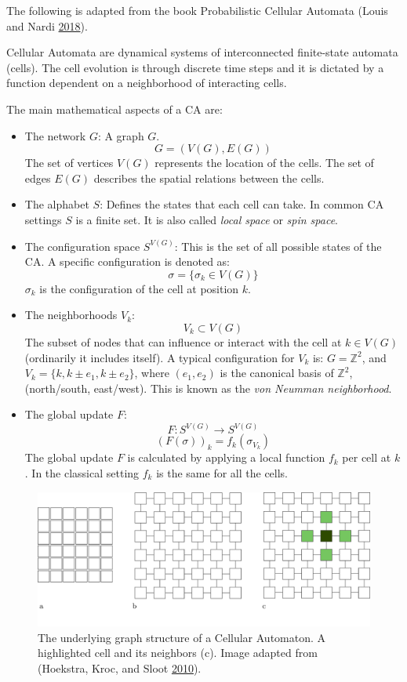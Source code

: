 \documentclass[
  12pt,
  openany]{book}
\begin{document}
The following is adapted from the book Probabilistic Cellular Automata (Louis and Nardi \protect\hyperlink{ref-louis2018probabilistic}{2018}).

Cellular Automata are dynamical systems of interconnected finite-state automata (cells). The cell evolution is through discrete time steps and it is dictated by a function dependent on a neighborhood of interacting cells.

The main mathematical aspects of a CA are:

\begin{itemize}
\item
  The network \(G\):
  A graph \(G\).
  \[ G = (V(G), E(G)) \]
  The set of vertices \(V(G)\) represents the location of the cells. The set of edges \(E(G)\) describes the spatial relations between the cells.
\item
  The alphabet \(S\):
  Defines the states that each cell can take. In common CA settings \(S\) is a finite set. It is also called \emph{local space} or \emph{spin space}.
\item
  The configuration space \(S^{V(G)}\):
  This is the set of all possible states of the CA. A specific configuration is denoted as:
  \[ \sigma = \{\sigma_k \in V(G)\} \]
  \(\sigma_k\) is the configuration of the cell at position \(k\).
\item
  The neighborhoods \(V_k\):
  \[ V_k \subset  V(G) \]
  The subset of nodes that can influence or interact with the cell at \(k \in V(G)\) (ordinarily it includes itself). A typical configuration for \(V_k\) is: \(G = \mathds{Z}^2\), and \(V_k = \{k, k \pm e_1, k \pm e_2\}\), where \((e_1, e_2)\) is the canonical basis of \(\mathds{Z}^2\), (north/south, east/west). This is known as the \emph{von Neumman neighborhood}.
\item
  The global update \(F\):
  \[ F: S^{V(G)} \rightarrow S^{V(G)} \]
  \[ (F(\sigma))_k = f_k(\sigma_{V_k}) \]
  The global update \(F\) is calculated by applying a local function \(f_k\) per cell at \(k\). In the classical setting \(f_k\) is the same for all the cells.
\end{itemize}



\begin{figure}

{\centering \includegraphics[width=0.8\linewidth]{pics/graph_structure} 

}

\caption{The underlying graph structure of a Cellular Automaton. A highlighted cell and its neighbors (c). Image adapted from (Hoekstra, Kroc, and Sloot \protect\hyperlink{ref-hoekstra2010simulating}{2010}).}\label{fig:CA-lattice}
\end{figure}
\end{document}
